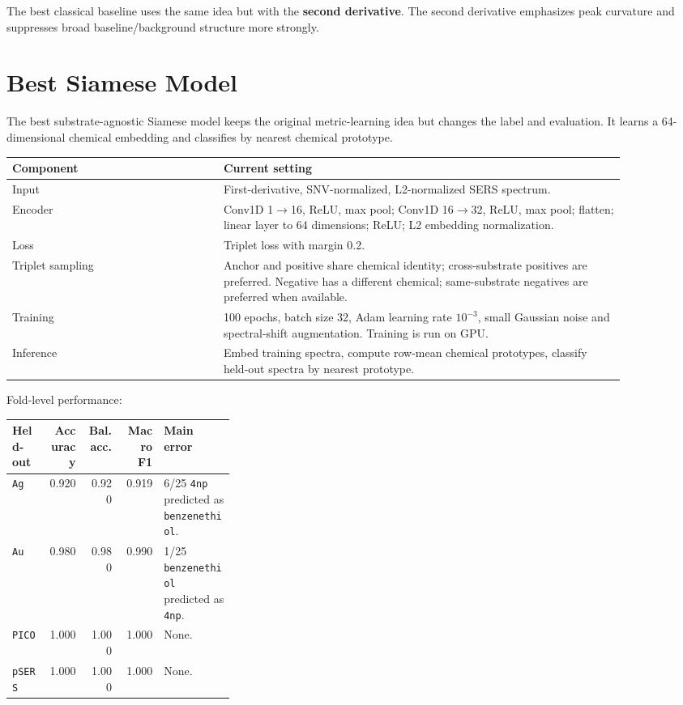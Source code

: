 \documentclass[11pt]{article}
\begin{document}
The best classical baseline uses the same idea but with the \textbf{second derivative}. The second derivative emphasizes peak curvature and suppresses broad baseline/background structure more strongly.

\section*{Best Siamese Model}

The best substrate-agnostic Siamese model keeps the original metric-learning idea but changes the label and evaluation. It learns a 64-dimensional chemical embedding and classifies by nearest chemical prototype.

\begin{center}
\begin{tabular}{p{0.30\linewidth}p{0.58\linewidth}}
\toprule
\textbf{Component} & \textbf{Current setting} \\
\midrule
Input & First-derivative, SNV-normalized, L2-normalized SERS spectrum. \\
Encoder & Conv1D 1$\rightarrow$16, ReLU, max pool; Conv1D 16$\rightarrow$32, ReLU, max pool; flatten; linear layer to 64 dimensions; ReLU; L2 embedding normalization. \\
Loss & Triplet loss with margin 0.2. \\
Triplet sampling & Anchor and positive share chemical identity; cross-substrate positives are preferred. Negative has a different chemical; same-substrate negatives are preferred when available. \\
Training & 100 epochs, batch size 32, Adam learning rate $10^{-3}$, small Gaussian noise and spectral-shift augmentation. Training is run on GPU. \\
Inference & Embed training spectra, compute row-mean chemical prototypes, classify held-out spectra by nearest prototype. \\
\bottomrule
\end{tabular}
\end{center}

Fold-level performance:

\begin{center}
\begin{tabular}{lrrrp{0.32\linewidth}}
\toprule
\textbf{Held-out} & \textbf{Accuracy} & \textbf{Bal. acc.} & \textbf{Macro F1} & \textbf{Main error} \\
\midrule
\texttt{Ag} & 0.920 & 0.920 & 0.919 & 6/25 \texttt{4np} predicted as \texttt{benzenethiol}. \\
\texttt{Au} & 0.980 & 0.980 & 0.990 & 1/25 \texttt{benzenethiol} predicted as \texttt{4np}. \\
\texttt{PICO} & 1.000 & 1.000 & 1.000 & None. \\
\texttt{pSERS} & 1.000 & 1.000 & 1.000 & None. \\
\bottomrule
\end{tabular}
\end{center}
\end{document}
